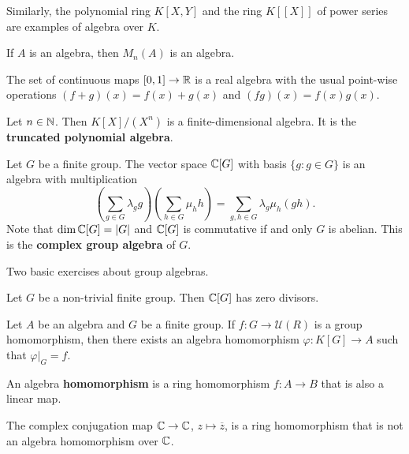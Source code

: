 Similarly, the polynomial ring $K[X,Y]$ and the ring $K[[X]]$ of power series are examples of algebra over $K$. 

\begin{example}
	If $A$ is an algebra, then  $M_n(A)$ is an algebra. 
\end{example}

\begin{example}
    The set of continuous maps $[0,1]\to\mathbb{R}$ is a real algebra with the usual point-wise operations $(f+g)(x)=f(x)+g(x)$ and $(fg)(x)=f(x)g(x)$. 
\end{example}

\begin{example}
    Let $n\in\mathbb{N}$. Then $K[X]/(X^n)$ is a finite-dimensional algebra. 
    It is the \textbf{truncated polynomial algebra}.  
\end{example}

\begin{example}
	Let $G$ be a finite group. The vector space 
	$\mathbb{C}[G]$ with basis $\{g:g\in G\}$
	is an algebra with multiplication
	\[
	\left(\sum_{g\in G}\lambda_gg\right)\left(\sum_{h\in G}\mu_hh\right)
	=\sum_{g,h\in G}\lambda_g\mu_h(gh).
	\] 	
	Note that $\dim\mathbb{C}[G]=|G|$ and
	$\mathbb{C}[G]$ is commutative if and only $G$ is abelian. 
	This is the \textbf{complex group algebra} of $G$. 
\end{example}

Two basic exercises about group algebras.
 
\begin{exercise}
	Let $G$ be a non-trivial finite group. 
	Then $\mathbb{C}[G]$ has zero divisors. 
\end{exercise}

\begin{exercise}
	Let $A$ be an algebra and $G$ be a finite group. 
	If $f\colon G\to\mathcal{U}(R)$ is a group homomorphism, 
	then there exists an algebra homomorphism 
	$\varphi\colon K[G]\to A$ such that $\varphi|_G=f$.   	
\end{exercise}

\begin{definition}
    An algebra \textbf{homomorphism} is a ring homomorphism $f\colon A\to B$ that is also a linear map. 
\end{definition}

The complex conjugation map  
$\mathbb{C}\to \mathbb{C}$, $z\mapsto\overline{z}$, is a ring homomorphism that is not an algebra homomorphism over $\mathbb{C}$. 

